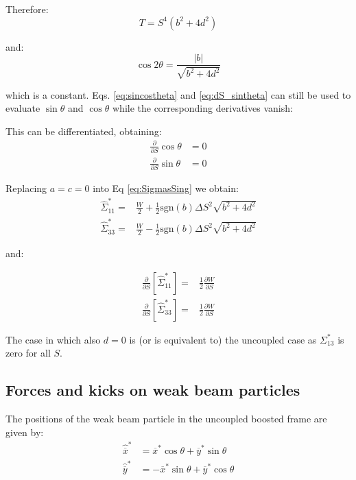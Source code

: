 Therefore:
\begin{equation}
T = S^4\left( b^2 + 4 d^2\right)
\end{equation}

and:
\begin{equation}
\cos 2 \theta = \frac{\left|b\right|}{\sqrt{b^2+4d^2}}
\end{equation}

which is a constant. Eqs. \ref{eq:sincostheta} and \ref{eq:dS_sintheta} can still be used to evaluate $\sin \theta$ and $\cos \theta$ while the corresponding derivatives vanish:

This can be differentiated, obtaining:
\begin{align}
\frac{\partial }{\partial S} \cos \theta &= 0\\
\frac{\partial }{\partial S} \sin \theta &= 0
\end{align}

Replacing $a=c=0$ into Eq \ref{eq:SigmasSing} we obtain:
\begin{align}
\hat{\Sigma}^*_{11}  =& \frac{W}{2}
+\frac{1}{2}\mathrm{sgn}(b)\Delta S^2\sqrt{b^2+4d^2} \\
\hat{\Sigma}^*_{33} =& \frac{W}{2}
-\frac{1}{2}\mathrm{sgn}(b)\Delta S^2\sqrt{b^2+4d^2}
\end{align}

and:

\begin{align}
\frac{\partial }{\partial S} \left[\hat{\Sigma}^*_{11} \right] =& \frac{1}{2}\frac{\partial W }{\partial S}\\
\frac{\partial }{\partial S} \left[\hat{\Sigma}^*_{33} \right] =& \frac{1}{2}\frac{\partial W }{\partial S}
\end{align}

The case in which also $d=0$ is (or is equivalent to) the uncoupled case as $\Sigma^*_{13}$ is zero for all $S$.




\subsection{Forces and kicks on weak beam particles}

The positions of the weak beam particle in the uncoupled boosted frame are given by:
\begin{align}
\hat{\overline{x}}^* &= \overline{x}^*\cos \theta  + \overline{y}^*\sin \theta \\
\hat{\overline{y}}^* &= -\overline{x}^*\sin \theta  + \overline{y}^* \cos \theta
\end{align}

